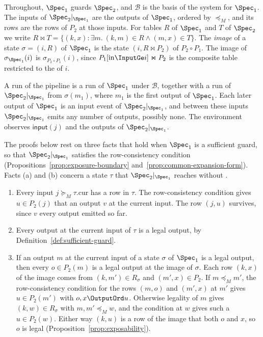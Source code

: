 Throughout, $\Spec_1$ guards $\Spec_2$, and $\mathcal B$ is the basis of the
system for $\Spec_1$.  The inputs of $\Spec_2|_{\Spec_1}$ are the outputs of
$\Spec_1$, ordered by $\preceq_M$, and its rows are the rows of $P_2$ at those
inputs.  For tables $R$ of $\Spec_1$ and $T$ of $\Spec_2$ we write $R\Join
T=\{(k,x):\exists m.\ (k,m)\in R\land(m,x)\in T\}$.  The \emph{image} of a
state $\sigma=(i,R)$ of $\Spec_1$ is the state $(i,R\Join P_2)$ of
$P_2\circ P_1$.  The image of $\sigma_{\Spec_1}(i)$ is
$\sigma_{P_2\circ P_1}(i)$, since $P_1[\mathrm{in}\InputGe i]\Join P_2$ is the
composite table restricted to the \indescs of $i$.

A run of the pipeline is a run of $\Spec_1$ under $\mathcal B$, together with
a run of $\Spec_2|_{\Spec_1}$ from $\sigma(m_1)$, where $m_1$ is the first
output of $\Spec_1$.  Each later output of $\Spec_1$ is an input event of
$\Spec_2|_{\Spec_1}$, and between these inputs $\Spec_2|_{\Spec_1}$ emits any
number of outputs, possibly none.  The environment observes
$\mathsf{input}(j)$ and the outputs of $\Spec_2|_{\Spec_1}$.

The proofs below rest on three facts that hold when $\Spec_1$ is a sufficient
guard, so that $\Spec_2|_{\Spec_1}$ satisfies the row-consistency condition
(Propositions~\ref{prop:exposure-boundary}
and~\ref{prop:common-expansion-form}).  Facts (a) and (b) concern a state $\tau$ that
$\Spec_2|_{\Spec_1}$ reaches without \commitment.
\begin{enumerate}[label=(\alph*)]
\item Every input $j\succeq_M\tau.\mathrm{cur}$ has a row in $\tau$.  The
  row-consistency condition gives $u\in P_2(j)$ that \outrel an output $v$ at
  the current input.  The row $(j,u)$ survives, since $v$ \outrel every output
  emitted so far.
\item Every output at the current input of $\tau$ is a legal output, by
  Definition~\ref{def:sufficient-guard}.
\item If an output $m$ at the current input of a state $\sigma$ of $\Spec_1$
  is a legal output, then every $o\in P_2(m)$ is a legal output at the image
  of $\sigma$.  Each row $(k,x)$ of the image comes from $(k,m')\in R_\sigma$
  and $(m',x)\in P_2$.  If $m\preceq_M m'$, the row-consistency condition for
  the rows $(m,o)$ and $(m',x)$ at $m'$ gives $u\in P_2(m')$ with
  $o,x\OutputOrd u$.  Otherwise legality of $m$ gives $(k,w)\in R_\sigma$ with
  $m,m'\preceq_M w$, and the condition at $w$ gives such a $u\in P_2(w)$.
  Either way $(k,u)$ is a row of the image that \outrel both $o$ and $x$, so
  $o$ is legal (Proposition~\ref{prop:exposability}).
\end{enumerate}

